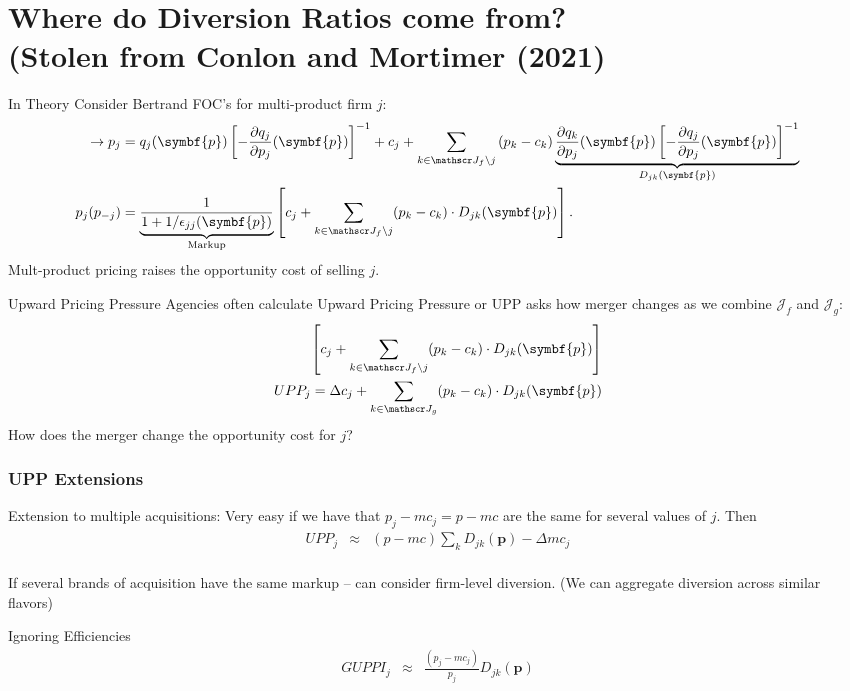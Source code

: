 \documentclass[aspectratio=169,10pt]{beamer}
\begin{document}
\section{Where do Diversion Ratios come from?\\ (Stolen from Conlon and Mortimer (2021)}
\begin{frame}{In Theory}
\footnotesize
Consider Bertrand FOC's for multi-product firm $j$:
\begin{align*}
\label{eq:best_response}
\rightarrow \nonumber p_j &=q_{j}(\symbf{p}) \left[-\frac{\partial q_{j}}{\partial p_{j}}(\symbf{p})\right]^{-1} + c_{j} + \sum_{k \in \calJ_{f} \setminus j} \left(p_{k}-c_{k}\right) \underbrace{\frac{\partial q_{k}}{\partial p_{j}}(\symbf{p})\left[-\frac{\partial q_{j}}{\partial p_{j}}(\symbf{p})\right]^{-1}}_{D_{jk}(\symbf{p})}\\
p_j(p_{-j}) &= \underbrace{\frac{1}{1+1/\epsilon_{jj}(\symbf{p})}}_{\text{Markup}} \left[ c_j + \sum_{k \in \calJ_{f} \setminus j}  (p_k-c_k) \cdot  D_{jk} (\symbf{p}) \right].
\end{align*}
Mult-product pricing \alert{raises the opportunity cost} of selling $j$.
\end{frame}

\begin{frame}{Upward Pricing Pressure}
Agencies often calculate \alert{Upward Pricing Pressure} or UPP asks how merger \alert{changes} as we combine $\mathcal{J}_f$ and $\mathcal{J}_g$:
\begin{align*}
\left[ c_j + \sum_{k \in \calJ_{f} \setminus j}  (p_k-c_k) \cdot  D_{jk} (\symbf{p}) \right] \\
UPP_j = \Delta c_j + \sum_{k \in \calJ_{g}}  (p_k-c_k) \cdot  D_{jk} (\symbf{p})
\end{align*}
How does the merger change the \alert{opportunity cost} for $j$?
\end{frame}

\begin{frame}
\frametitle{UPP Extensions}
\begin{block}{Extension to multiple acquisitions:}
Very easy if we have that $p_j - mc_j = p - mc$ are the same for several values of $j$.  Then
\begin{eqnarray*}
UPP_j &\approx& (p - mc) \sum_k D_{jk}(\symbf{p}) -  \Delta mc_j \\
\end{eqnarray*}
\end{block}
If several brands of acquisition have the same markup -- can consider firm-level diversion. (We can aggregate diversion across similar flavors)
\begin{block}{Ignoring Efficiencies}
\begin{eqnarray*}
GUPPI_j &\approx& \frac{(p_j - mc_j)}{p_j} D_{jk}(\symbf{p}) \\
\end{eqnarray*}
\end{block}
\end{frame}
\end{document}
